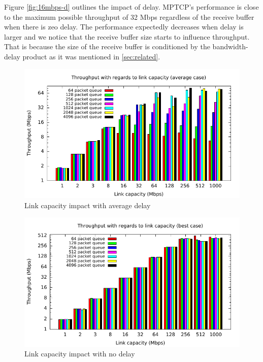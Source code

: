 Figure \ref{fig:16mbps-d} outlines the impact of delay. MPTCP's performance is close to the maximum possible throughput of 32 Mbps regardless of the receive buffer when there is zeo delay. The performance expectedly decreases when delay is larger and we notice that the receive buffer size starts to influence throughput. That is because the size of the receive buffer is conditioned by the bandwidth-delay product as it was mentioned in \ref{sec:related}.

\begin{figure}
  \centering
  \includegraphics[width=\textwidth]{img/throughput-bdw-avg}
  \caption{Link capacity impact with average delay}
  \label{fig:bdw-avg}
\end{figure}

\begin{figure}
  \centering
  \includegraphics[width=\textwidth]{img/throughput-bdw-max}
  \caption{Link capacity impact with no delay}
  \label{fig:bdw-max}
\end{figure}

